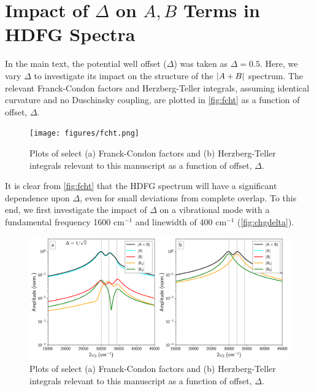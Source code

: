 \documentclass[aip, jcp, reprint, onecolumn, nofootinbib]{revtex4-2}
\begin{document}
\section{Impact of $\Delta$ on $A,B$ Terms in HDFG Spectra}
In the main text, the potential well offset ($\Delta$) was taken as $\Delta = 0.5$.
Here, we vary $\Delta$ to investigate its impact on the structure of the $\abs{A+B}$ spectrum.
The relevant Franck-Condon factors and Herzberg-Teller integrals, assuming identical curvature and no Duschinsky coupling, are plotted in \autoref{fig:fcht} as a function of offset, $\Delta$.

\begin{figure}[!htbp]
	\centering
	\texttt{[image: figures/fcht.png]}
	\caption{Plots of select (a) Franck-Condon factors and (b) Herzberg-Teller integrals relevant to this manuscript as a function of offset, $\Delta$.} 
	\label{fig:fcht}
\end{figure}

It is clear from \autoref{fig:fcht} that the HDFG spectrum will have a significant dependence upon $\Delta$, even for small deviations from complete overlap. 
To this end, we first investigate the impact of $\Delta$ on a vibrational mode with a fundamental frequency 1600 cm$^{-1}$ and linewidth of 400 cm$^{-1}$ (\autoref{fig:chgdelta}). 

\begin{figure}[!htbp]
	\centering
	\includegraphics[width=6.675in]{figures/changedelta.png}
	\caption{Plots of select (a) Franck-Condon factors and (b) Herzberg-Teller integrals relevant to this manuscript as a function of offset, $\Delta$.} 
	\label{fig:chgdelta}
\end{figure}
\end{document}
